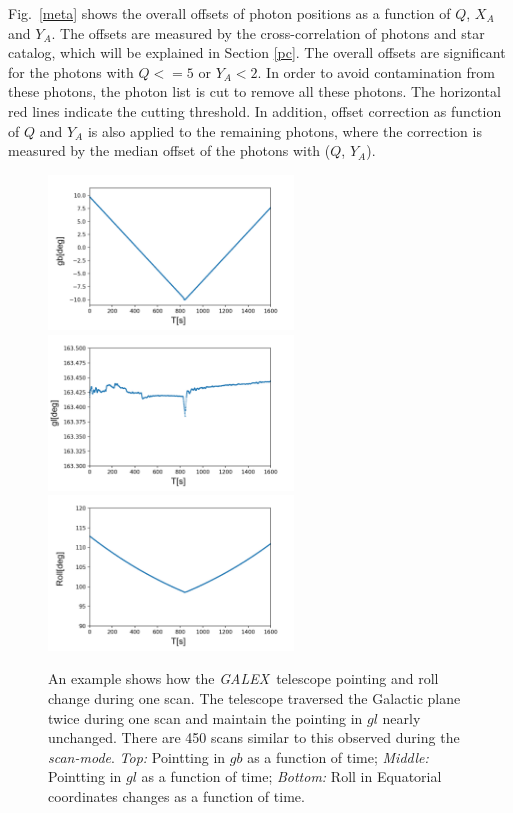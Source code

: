 \documentclass[12pt, preprint]{aastex}
\newcommand{\project}[1]{\textsl{#1}}
\newcommand{\galex}{\project{GALEX}}
\newcommand{\scanmode}{\project{scan-mode}}
\begin{document}
Fig.~\ref{meta} shows the overall offsets of photon positions as a function of $Q$, $X_A$ and $Y_A$.
The offsets are measured by the cross-correlation of photons and star catalog, which will be explained in Section \ref{pc}.
The overall offsets are significant for the photons with $Q<=5$ or $Y_A<2$.
In order to avoid contamination from these photons, the photon list is cut to remove all these photons.
The horizontal red lines indicate the cutting threshold.
In addition, offset correction as function of $Q$ and $Y_A$ is also applied to the remaining photons, where the correction is measured by the median offset of the photons with ($Q$, $Y_A$).

\begin{figure}[p]
\begin{center}
\includegraphics[width=0.58\textwidth]{figures/01634_0001-gb-new}
\includegraphics[width=0.58\textwidth]{figures/01634_0001-gl-new}
\includegraphics[width=0.58\textwidth]{figures/01634_0001-roll-new}
\end{center}
\caption{%
  \label{telescope}
  An example shows how the \galex\ telescope pointing and roll change during one scan.
  The telescope traversed the Galactic plane twice during one scan and maintain the pointing in $gl$ nearly unchanged.
  There are 450 scans similar to this observed during the \scanmode. 
  \emph{Top:}  Pointting in $gb$ as a function of time;
  \emph{Middle:} Pointting in $gl$ as a function of time;
  \emph{Bottom:} Roll in Equatorial coordinates changes as a function of time.
}
\end{figure}
\end{document}
